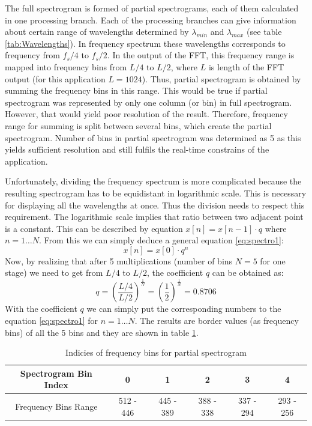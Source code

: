 \documentclass[twoside]{ctuthesis}
\theoremstyle{plain}
\theoremstyle{definition}
\theoremstyle{note}
\begin{document}
The full spectrogram is formed of partial spectrograms, each of them calculated in one processing branch. Each of the processing branches can give information about certain range of wavelengths determined by $\lambda_{min}$ and $\lambda_{max}$ (see table \ref{tab:Wavelengths}). In frequency spectrum these wavelengths corresponds to frequency from $f_s/4$ to $f_s/2$. In the output of the FFT, this frequency range is mapped into frequency bins from $L/4$ to $L/2$, where $L$ is length of the FFT output (for this application $L=1024$). Thus, partial spectrogram is obtained by summing the frequency bins in this range. 
This would be true if partial spectrogram was represented by only one column (or bin) in full spectrogram. However, that would yield poor resolution of the result. Therefore, frequency range for summing is split between several bins, which create the partial spectrogram. Number of bins in partial spectrogram was determined as 5 as this yields sufficient resolution and still fulfils the real-time constrains of the application. 

Unfortunately, dividing the frequency spectrum is more complicated because the resulting spectrogram has to be equidistant in logarithmic scale. This is necessary for displaying all the wavelengths at once. Thus the division needs to respect this requirement. The logarithmic scale implies that ratio between two adjacent point is a constant. This can be described by equation $x[n]=x[n-1]\cdot q$ where $n=1\ldots N$.
From this we can simply deduce a general equation \ref{eq:spectro1}:
\begin{equation} \label{eq:spectro1}
x[n]=x[0]\cdot q^n
\end{equation}
Now, by realizing that after 5 multiplications (number of bins $N=5$ for one stage) we need to get from $L/4$ to $L/2$, the coefficient $q$ can be obtained as:
\begin{equation} \label{eq:spectro2}
q={\left(\frac{L/4}{L/2}\right)}^{\frac{1}{N}}={\left(\frac{1}{2}\right)}^{\frac{1}{N}}=0.8706
\end{equation}
With the coefficient $q$ we can simply put the corresponding numbers to the equation \ref{eq:spectro1} for $n=1\ldots N$. The results are border values (as frequency bins) of all the 5 bins and they are shown in table \ref{tab:indiciesBins}.

\begin{table}[htbp]
	\centering
	\caption{Indicies of frequency bins for partial spectrogram}
	\begin{tabular}{cccccc}
		\toprule
		Spectrogram Bin Index & 0 & 1 & 2 & 3 & 4 \\
		\midrule
		Frequency Bins Range  & 512 - 446  & 445 - 389 & 388 - 338 & 337 - 294 & 293 - 256  \\
		\bottomrule
	\end{tabular}%
	\label{tab:indiciesBins}%
\end{table}%
\end{document}
